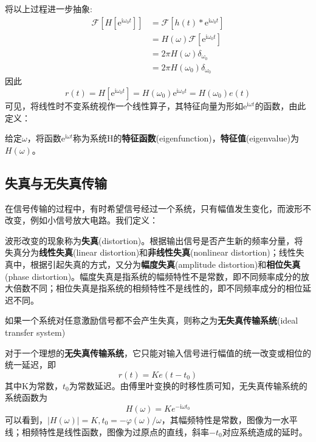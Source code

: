 \documentclass{ctexbook}
\begin{document}
将以上过程进一步抽象:
\begin{align*}
    \mathcal{F}\left[H[\mathrm{e}^{\mathrm{i}\omega_0 t}]\right]&=\mathcal{F} \left[h(t)*\mathrm{e}^{\mathrm{i}\omega_0 t}\right]\\
    &=H(\omega)\mathcal{F} \left[\mathrm{e}^{\mathrm{i}\omega_0 t}\right]\\
    &=2\pi H(\omega)\delta_{\omega_0}\\
    &=2\pi H(\omega_0)\delta_{\omega_0}
\end{align*}
因此\[r(t)=H\left[\mathrm{e}^{\mathrm{i}\omega_0 t}\right]=H(\omega_0)\mathrm{e}^{\mathrm{i}\omega_0 t}=H(\omega_0)e(t)\]
可见，将线性时不变系统视作一个线性算子，其特征向量为形如$\mathrm{e}^{\mathrm{i}\omega t}$的函数，由此定义：
\begin{definition}[特征函数]
    给定$\omega$，将函数$\mathrm{e}^{\mathrm{i}\omega t}$称为系统H的\textbf{特征函数}(eigenfunction)，\textbf{特征值}(eigenvalue)为$H(\omega)$。
\end{definition}

\subsection{失真与无失真传输}\label{sub:distortion}
在信号传输的过程中，有时希望信号经过一个系统，只有幅值发生变化，而波形不改变，例如小信号放大电路。我们定义：
\begin{definition}[失真]
波形改变的现象称为\textbf{失真}(distortion)。根据输出信号是否产生新的频率分量，将失真分为\textbf{线性失真}(linear distortion)和\textbf{非线性失真}(nonlinear distortion)；线性失真中，根据引起失真的方式，又分为\textbf{幅度失真}(amplitude distortion)和\textbf{相位失真}(phase distortion)。幅度失真是指系统的幅频特性不是常数，即不同频率成分的放大倍数不同；相位失真是指系统的相频特性不是线性的，即不同频率成分的相位延迟不同。
\end{definition}
\begin{definition}[无失真传输系统]
如果一个系统对任意激励信号都不会产生失真，则称之为\textbf{无失真传输系统}(ideal transfer system)
\end{definition}

对于一个理想的\textbf{无失真传输系统}，它只能对输入信号进行幅值的统一改变或相位的统一延迟，即\[r(t)=Ke(t-t_0)\]其中K为常数，$t_0$为常数延迟。由傅里叶变换的时移性质可知，无失真传输系统的系统函数为
\[H(\omega) = Ke^{-\mathrm{i}\omega t_0}\]
可以看到，$|H(\omega)|=K,t_0=-\varphi(\omega)/\omega$，其幅频特性是常数，图像为一水平线；相频特性是线性函数，图像为过原点的直线，斜率$-t_0$对应系统造成的延时。
\end{document}

